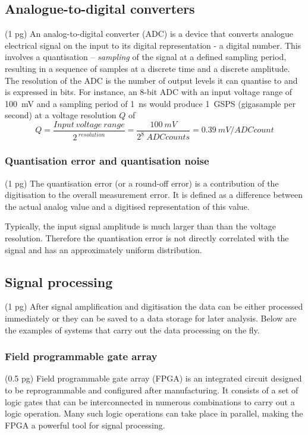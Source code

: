 \documentclass[12pt]{mytustyle}  %
\begin{document}
\subsection{Analogue-to-digital converters}
(1 pg)
An analog-to-digital converter (ADC) is a device that converts analogue electrical signal on the input to its digital representation - a digital number. This involves a quantisation -- \emph{sampling} of the signal at a defined sampling period, resulting in a sequence of samples at a discrete time and a discrete amplitude. The resolution of the ADC is the number of output levels it can quantise to and is expressed in bits. For instance, an 8-bit ADC with an input voltage range of 100~mV and a sampling period of 1~ns would produce 1~GSPS (gigasample per second) at a voltage resolution $Q$ of 
\begin{equation}
\label{eq:mvpercnt}
Q=\frac{Input~voltage~range}{2^{~resolution}}  = \frac{100~mV}{2^8~ADC counts} = 0.39~mV/ADC count
\end{equation} 


\subsubsection{Quantisation error and quantisation noise}
(1 pg)
The quantisation error (or a round-off error) is a contribution of the digitisation to the overall measurement error. It is defined as a difference between the actual analog value and a digitised representation of this value.

Typically, the input signal amplitude is much larger than than the voltage resolution. Therefore the quantisation error is not directly correlated with the signal and has an approximately uniform distribution. 


\subsection{Signal processing}
(1 pg)
After signal amplification and digitisation the data can be either processed immediately or they can be saved to a data storage for later analysis. Below are the examples of systems that carry out the data processing on the fly.

\subsubsection{Field programmable gate array}
(0.5 pg)
Field programmable gate array (FPGA) is an integrated circuit designed to be reprogrammable and configured after manufacturing. It consists of a set of logic gates that can be interconnected in numerous combinations to carry out a logic operation. Many such logic operations can take place in parallel, making the FPGA a powerful tool for signal processing.
\end{document}
